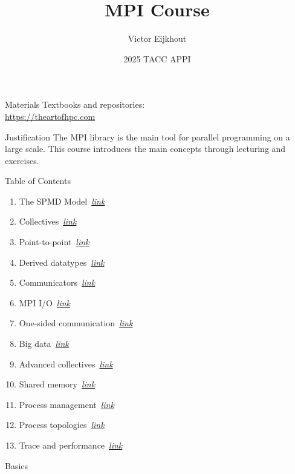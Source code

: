 \documentclass[10pt]{beamer}
\begin{document}
\author[Eijkhout]{Victor Eijkhout}
\date[2025]{2025 TACC APPI}
\title[MPI]{MPI Course}
\maketitle

\begin{frame}[containsverbatim]{Materials}
    Textbooks and repositories:\\
    \url{https://theartofhpc.com}
\end{frame}

\begin{frame}{Justification}
  The MPI library is the main tool
  for parallel programming on a large scale.
  This course introduces the main concepts
  through lecturing and exercises.
\end{frame}

\begin{frame}{Table of Contents}
  \begin{enumerate}
  \item The SPMD Model~\hyperlink{sec:spmd}{\textsl{link}}
  \item Collectives~\hyperlink{sec:collectives}{\textsl{link}}
  \item Point-to-point~\hyperlink{sec:ptp}{\textsl{link}}
  \item Derived datatypes~\hyperlink{sec:derived}{\textsl{link}}
  \item Communicators~\hyperlink{sec:comm}{\textsl{link}}
  \item MPI I/O~\hyperlink{sec:io}{\textsl{link}}
  \item One-sided communication~\hyperlink{sec:1side}{\textsl{link}}
  \item Big data~\hyperlink{sec:bigdata}{\textsl{link}}
  \item Advanced collectives~\hyperlink{sec:coll2}{\textsl{link}}
  \item Shared memory~\hyperlink{sec:shared}{\textsl{link}}
  \item Process management~\hyperlink{sec:process}{\textsl{link}}
  \item Process topologies~\hyperlink{sec:topo}{\textsl{link}}
  \item Trace and performance~\hyperlink{sec:trace}{\textsl{link}}
  \end{enumerate}
\end{frame}

\frame{\tableofcontents}
{} {Basics}
\end{document}
